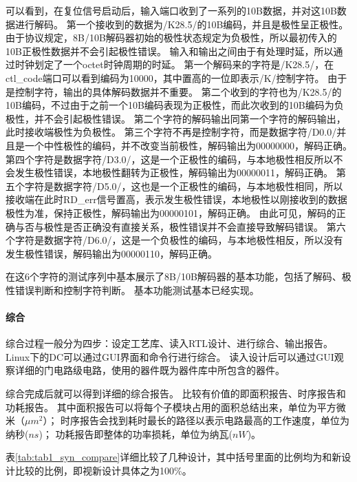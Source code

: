 \documentclass[UTF8]{ctexart}
\begin{document}
可以看到，在复位信号启动后，输入端口收到了一系列的10B数据，并对这10B数据进行解码。
第一个接收到的数据为/K28.5/的10B编码，并且是极性呈正极性。
由于协议规定，8B/10B解码器初始的极性状态规定为负极性，所以最初传入的10B正极性数据并不会引起极性错误。
输入和输出之间由于有处理时延，所以通过时钟划定了一个octet时钟周期的时延。
第一个解码来的字符是/K28.5/，在ctl\_code端口可以看到编码为10000，其中置高的一位即表示/K/控制字符。
由于是控制字符，输出的具体解码数据并不重要。
第二个收到的字符也为/K28.5/的10B编码，不过由于之前一个10B编码表现为正极性，而此次收到的10B编码为负极性，并不会引起极性错误。
第二个字符的解码输出同第一个字符的解码输出，此时接收端极性为负极性。
第三个字符不再是控制字符，而是数据字符/D0.0/并且是一个中性极性的编码，并不改变当前极性，解码输出为00000000，解码正确。
第四个字符是数据字符/D3.0/，这是一个正极性的编码，与本地极性相反所以不会发生极性错误，本地极性翻转为正极性，解码输出为00000011，解码正确。
第五个字符是数据字符/D5.0/，这也是一个正极性的编码，与本地极性相同，所以接收端在此时RD\_err信号置高，表示发生极性错误，本地极性以刚接收到的数据极性为准，保持正极性，解码输出为00000101，解码正确。
由此可见，解码的正确与否与极性是否正确没有直接关系，极性错误并不会直接导致解码错误。
第六个字符是数据字符/D6.0/，这是一个负极性的编码，与本地极性相反，所以没有发生极性错误，解码输出为00000110，解码正确。

在这6个字符的测试序列中基本展示了8B/10B解码器的基本功能，包括了解码、极性错误判断和控制字符判断。
基本功能测试基本已经实现。

\paragraph{综合}

综合过程一般分为四步：设定工艺库、读入RTL设计、进行综合、输出报告。
Linux下的DC可以通过GUI界面和命令行进行综合。
读入设计后可以通过GUI观察详细的门电路级电路，使用的器件既为器件库中所包含的器件。

综合完成后就可以得到详细的综合报告。
比较有价值的即面积报告、时序报告和功耗报告。
其中面积报告可以将每个子模块占用的面积总结出来，单位为平方微米（$\mu m^2$）；
时序报告会找到耗时最长的路径以表示电路最高的工作速度，单位为纳秒($ns$)；
功耗报告即整体的功率损耗，单位为纳瓦($nW$)。

表\ref{tab:tab1_syn_compare}详细比较了几种设计，其中括号里面的比例均为和新设计比较的比例，即视新设计具体之为100\%。
\end{document}
